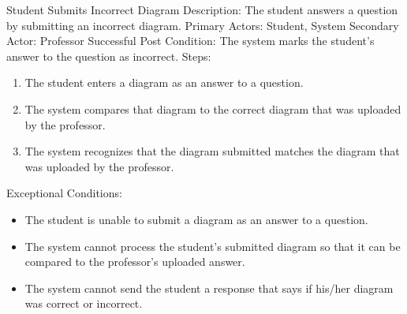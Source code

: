     \begin{section}{Student Submits Incorrect Diagram}
        Description: The student answers a question by submitting an incorrect diagram. \newline
        Primary Actors: Student, System \newline
        Secondary Actor: Professor \newline
        Successful Post Condition: The system marks the student’s answer to the question as incorrect. \newline
        Steps:
        \begin{enumerate}
            \item{The student enters a diagram as an answer to a question.}
            \item{The system compares that diagram to the correct diagram that was uploaded by the professor.}
            \item{The system recognizes that the diagram submitted matches the diagram that was uploaded by the professor.}
        \end{enumerate}
        Exceptional Conditions:
        \begin{itemize}
            \item{The student is unable to submit a diagram as an answer to a question.}
            \item{The system cannot process the student’s submitted diagram so that it can be compared to the professor’s uploaded answer.}
            \item{The system cannot send the student a response that says if his/her diagram was correct or incorrect.}
        \end{itemize}
    \end{section}
    
